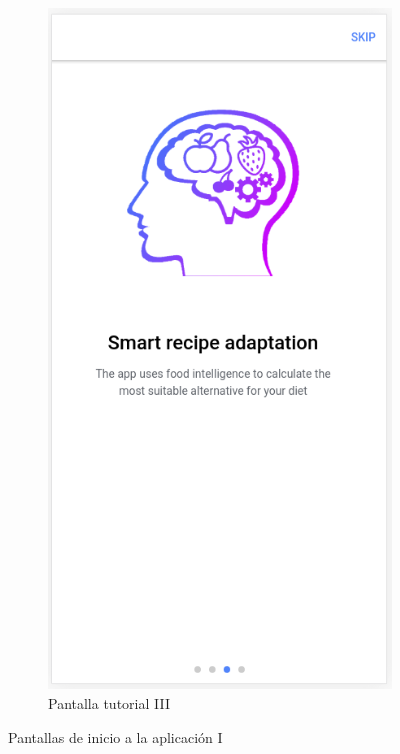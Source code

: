 \begin{figure}[H]
\begin{subfigure}[b]{0.31
    \linewidth}
        \label{fig:app_tutorial2}
    \end{subfigure}
        \begin{subfigure}[b]{0.31
        \linewidth}
        \includegraphics[width=\linewidth]{imagenes/app/pantallas/app_tutorial3.png}
        \caption{Pantalla tutorial III}
        \label{fig:app_tutorial3}
    \end{subfigure}
    \caption{Pantallas de inicio a la aplicación I}
    \label{fig:pantallas_inicio1}
\end{figure}

